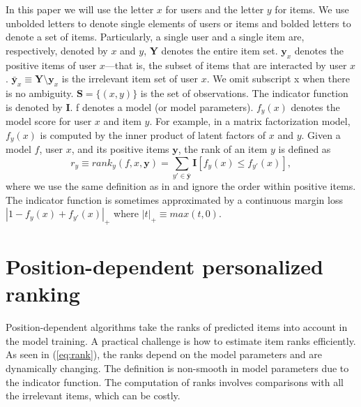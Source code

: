 \documentclass[letterpaper]{article} %
\newcommand{\TODO}[1]{\textcolor{blue}{TODO:~#1}}
\begin{document}
In this paper we will use the letter $x$ for users and the letter $y$ for items. We use unbolded letters to denote single elements of users or items and bolded letters to denote a set of items. Particularly, a single user and a single item are, respectively, denoted by $x$ and $y$, \textbf{Y} denotes the entire item set. $\textbf{y}_x$ denotes the positive items of user $x$---that is, the subset of items that are interacted by user $x$. $\bar{\textbf{y}}_x\equiv\textbf{Y} \setminus \textbf{y}_x$ is the irrelevant item set of user $x$. We omit subscript x when there is no ambiguity. $\textbf{S}=\{(x,y)\}$ is the set of observations. The indicator function is denoted by \textbf{I}. f denotes a model (or model parameters).  $f_y(x)$ denotes the model score for user $x$ and item $y$. For example, in a matrix factorization model, $f_y(x)$ is computed by the inner product of latent factors of $x$ and $y$. Given a model $f$, user $x$, and its positive items $\textbf{y}$, the rank of an item $y$ is defined as 
\begin{equation}
\label{eq:rank}
r_y\equiv rank_y(f,x,\textbf{y}) =\sum_{y'\in\bar{\textbf{y}}} \textbf{I}[f_y(x) \le f_{y'}(x)],
\end{equation}
where we use the same definition as in \cite{usunier2009ranking} and ignore the order within positive items. The indicator function is sometimes approximated by a continuous margin loss $|1-f_y(x) + f_{y'}(x)|_+$ where $|t|_+ \equiv max(t,0)$.

\section{Position-dependent personalized ranking}


Position-dependent algorithms take the ranks of predicted items into account in the model training. A practical challenge is how to estimate item ranks efficiently. As seen in (\ref{eq:rank}), the ranks depend on the model parameters and are dynamically changing. The definition is non-smooth in model parameters due to the indicator function. The computation of ranks involves comparisons with all the irrelevant items, which can be costly. 
\end{document}
